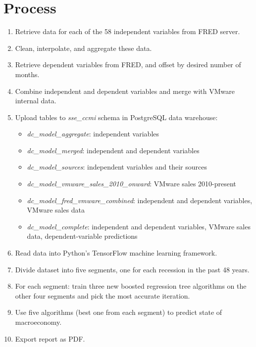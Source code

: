 \documentclass[a4paper,12pt]{article}
\begin{document}
	\pagebreak

	\section{Process}
		\begin{enumerate}
			\item Retrieve data for each of the 58 independent variables from FRED server.
			\item Clean, interpolate, and aggregate these data.
			\item Retrieve dependent variables from FRED, and offset by desired number of months.
			\item Combine independent and dependent variables and merge with VMware internal data.
			\item Upload tables to \textit{sse\_ccmi} schema in PostgreSQL data warehouse: 
				\begin{itemize}
					\item \textit{dc\_model\_aggregate}: independent variables
					\item \textit{dc\_model\_merged}: independent and dependent variables
					\item \textit{dc\_model\_sources}: independent variables and their sources
					\item \textit{dc\_model\_vmware\_sales\_2010\_onward}: VMware sales 2010-present
					\item \textit{dc\_model\_fred\_vmware\_combined}: independent and dependent variables, VMware sales data
					\item \textit{dc\_model\_complete}: independent and dependent variables, VMware sales data, dependent-variable 
						predictions
				\end{itemize}
			\item Read data into Python's TensorFlow machine learning framework.
			\item Divide dataset into five segments, one for each recession in the past 48 years.
			\item For each segment: train three new boosted regression tree algorithms on the other four segments and pick the most accurate iteration.
			\item Use five algorithms (best one from each segment) to predict state of macroeconomy.
			\item Export report as PDF.
		\end{enumerate}

 
\end{document}
